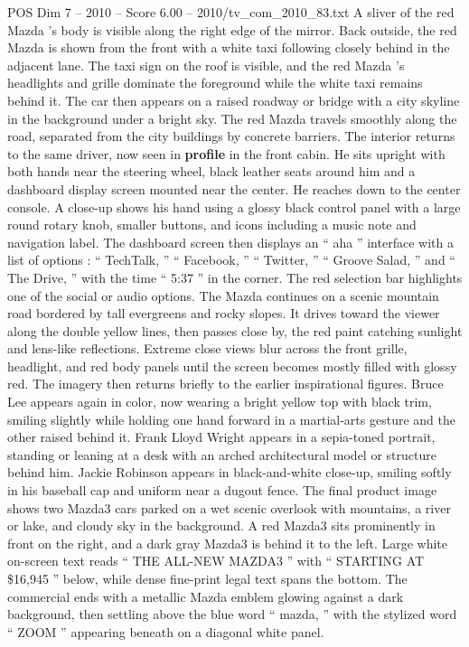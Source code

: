 \begin{textsample}{POS Dim 7 – 2010 – Score 6.00 – 2010/tv\_com\_2010\_83.txt}
A sliver of the red Mazda ’s body is visible along the right edge of the mirror.
Back outside, the red Mazda is shown from the front with a white taxi following closely behind in the adjacent lane.
The taxi sign on the roof is visible, and the red Mazda ’s headlights and grille dominate the foreground while the white taxi remains behind it.
The car then appears on a raised roadway or bridge with a city skyline in the background under a bright sky.
The red Mazda travels smoothly along the road, separated from the city buildings by concrete barriers.
The interior returns to the same driver, now seen in \textbf{profile} in the front cabin.
He sits upright with both hands near the steering wheel, black leather seats around him and a dashboard display screen mounted near the center.
He reaches down to the center console.
A close-up shows his hand using a glossy black control panel with a large round rotary knob, smaller buttons, and icons including a music note and navigation label.
The dashboard screen then displays an “ aha ” interface with a list of options : “ TechTalk, ” “ Facebook, ” “ Twitter, ” “ Groove Salad, ” and “ The Drive, ” with the time “ 5:37 ” in the corner.
The red selection bar highlights one of the social or audio options.
The Mazda continues on a scenic mountain road bordered by tall evergreens and rocky slopes.
It drives toward the viewer along the double yellow lines, then passes close by, the red paint catching sunlight and lens-like reflections.
Extreme close views blur across the front grille, headlight, and red body panels until the screen becomes mostly filled with glossy red.
The imagery then returns briefly to the earlier inspirational figures.
Bruce Lee appears again in color, now wearing a bright yellow top with black trim, smiling slightly while holding one hand forward in a martial-arts gesture and the other raised behind it.
Frank Lloyd Wright appears in a sepia-toned portrait, standing or leaning at a desk with an arched architectural model or structure behind him.
Jackie Robinson appears in black-and-white close-up, smiling softly in his baseball cap and uniform near a dugout fence.
The final product image shows two Mazda3 cars parked on a wet scenic overlook with mountains, a river or lake, and cloudy sky in the background.
A red Mazda3 sits prominently in front on the right, and a dark gray Mazda3 is behind it to the left.
Large white on-screen text reads “ THE ALL-NEW MAZDA3 ” with “ STARTING AT \$16,945 ” below, while dense fine-print legal text spans the bottom.
The commercial ends with a metallic Mazda emblem glowing against a dark background, then settling above the blue word “ mazda, ” with the stylized word “ ZOOM ” appearing beneath on a diagonal white panel.

\end{textsample}
